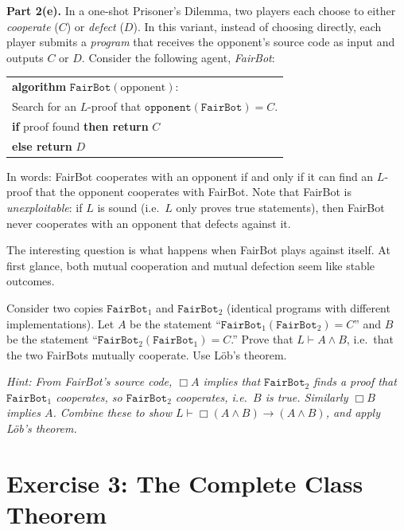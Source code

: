 \documentclass[8pt]{article}
\begin{document}
\medskip
\noindent
\textbf{Part 2(e).} In a one-shot Prisoner's Dilemma, two players each choose to
either \emph{cooperate} ($C$) or \emph{defect} ($D$). In this variant, instead of
choosing directly, each player submits a \emph{program} that receives the opponent's
source code as input and outputs $C$ or $D$. Consider the following agent,
\emph{FairBot}:

\medskip
\begin{center}
\begin{tabular}{l}
\textbf{algorithm} $\texttt{FairBot}(\text{opponent})$:\\
\quad Search for an $L$-proof that
  $\texttt{opponent}(\texttt{FairBot}) = C$.\\
\quad \textbf{if} proof found \textbf{then return} $C$\\
\quad \textbf{else return} $D$
\end{tabular}
\end{center}

\medskip
\noindent
In words: FairBot cooperates with an opponent if and only if it can find an $L$-proof
that the opponent cooperates with FairBot. Note that FairBot is
\emph{unexploitable}: if $L$ is sound (i.e.\ $L$ only proves true statements), then
FairBot never cooperates with an opponent that defects against it.

\medskip
\noindent
The interesting question is what happens when FairBot plays against itself. At first
glance, both mutual cooperation and mutual defection seem like stable outcomes.

\medskip
\noindent
Consider two copies $\texttt{FairBot}_1$ and $\texttt{FairBot}_2$ (identical programs
with different implementations). Let $A$ be the statement
``$\texttt{FairBot}_1(\texttt{FairBot}_2) = C$'' and $B$ be the statement
``$\texttt{FairBot}_2(\texttt{FairBot}_1) = C$.'' Prove that
$L \vdash A \wedge B$, i.e.\ that the two FairBots mutually cooperate. Use L\"ob's
theorem.

\medskip
\noindent
\emph{Hint: From FairBot's source code, $\Box A$ implies that
$\texttt{FairBot}_2$ finds a proof that $\texttt{FairBot}_1$ cooperates, so
$\texttt{FairBot}_2$ cooperates, i.e.\ $B$ is true. Similarly $\Box B$ implies $A$.
Combine these to show $L \vdash \Box(A \wedge B) \to (A \wedge B)$, and apply L\"ob's
theorem.}




\section{Exercise 3: The Complete Class Theorem}
\end{document}
